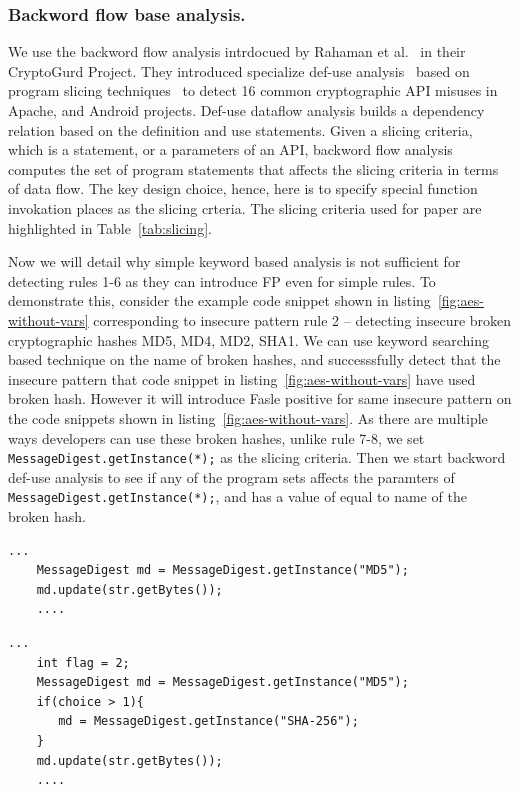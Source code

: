 \subsubsection{Backword flow base analysis.}
We use the backword flow analysis intrdocued by Rahaman et al.~\cite{cryptogurd} in their CryptoGurd Project. They introduced specialize def-use analysis~\cite{use-def} based on program slicing techniques~\cite{program-slicing} to detect 16 common cryptographic API misuses in Apache, and Android projects. Def-use  dataflow analysis builds a dependency relation based on the definition and use statements. Given a slicing criteria, which is a statement, or a parameters of an API, backword flow analysis computes the set of program statements that affects the slicing criteria in terms of data flow. The key design choice, hence, here is to specify special function invokation places as the slicing crteria. The slicing criteria used for paper are highlighted in Table~\ref{tab:slicing}. 

Now we will detail why simple keyword based analysis is not sufficient for detecting rules 1-6 as they can introduce FP even for simple rules. To demonstrate this, consider the example code snippet shown in listing~\ref{fig:aes-without-vars} corresponding to insecure pattern rule 2 -- detecting insecure broken cryptographic hashes MD5, MD4, MD2, SHA1. We can use keyword searching based technique on the name of broken hashes, and successsfully detect that the insecure pattern that code snippet in listing~\ref{fig:aes-without-vars} have used broken hash. However it will introduce Fasle positive for same insecure pattern on the code snippets shown in listing~\ref{fig:aes-without-vars}.%
As there are multiple ways developers can use these broken hashes, unlike rule 7-8, we set \texttt{MessageDigest.getInstance(*);} as the slicing criteria. Then we start backword def-use analysis to see if any of the program sets affects the paramters of \texttt{MessageDigest.getInstance(*);}, and has a value of equal to name of the broken hash.


\begin{lstlisting}[caption={A code snippet where keyword based detection work well}, label={fig:aes-without-vars}]
    ...
    MessageDigest md = MessageDigest.getInstance("MD5");
    md.update(str.getBytes());
    ....
\end{lstlisting}

\begin{lstlisting}[caption={A code snippet where keyword based detection introduces FP}, label={fig:aes-with-vars}]
    ...
    int flag = 2;
    MessageDigest md = MessageDigest.getInstance("MD5");
    if(choice > 1){
       md = MessageDigest.getInstance("SHA-256");
    }
    md.update(str.getBytes());
    ....
\end{lstlisting}


